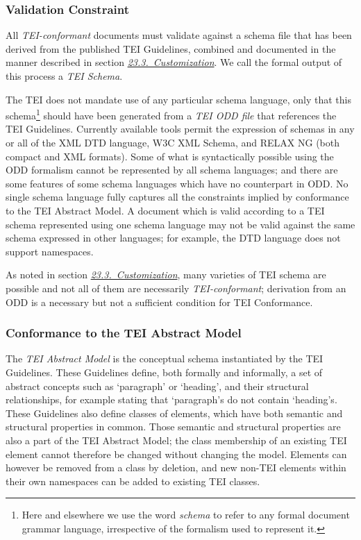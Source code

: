 \subsubsection[{Validation Constraint}]{Validation Constraint}\label{CFVL}\par
All \textit{TEI-conformant} documents must validate against a schema file that has been derived from the published TEI Guidelines, combined and documented in the manner described in section \textit{\hyperref[MD]{23.3.\ Customization}}. We call the formal output of this process a \textit{TEI Schema}.\par
The TEI does not mandate use of any particular schema language, only that this schema\footnote{Here and elsewhere we use the word \textit{schema} to refer to any formal document grammar language, irrespective of the formalism used to represent it.} should have been generated from a \textit{TEI ODD file} that references the TEI Guidelines. Currently available tools permit the expression of schemas in any or all of the XML DTD language, W3C XML Schema, and RELAX NG (both compact and XML formats). Some of what is syntactically possible using the ODD formalism cannot be represented by all schema languages; and there are some features of some schema languages which have no counterpart in ODD. No single schema language fully captures all the constraints implied by conformance to the TEI Abstract Model. A document which is valid according to a TEI schema represented using one schema language may not be valid against the same schema expressed in other languages; for example, the DTD language does not  support namespaces. \par
As noted in section \textit{\hyperref[MD]{23.3.\ Customization}}, many varieties of TEI schema are possible and not all of them are necessarily \textit{TEI-conformant}; derivation from an ODD is a necessary but not a sufficient condition for TEI Conformance.
\subsubsection[{Conformance to the TEI Abstract Model}]{Conformance to the TEI Abstract Model}\label{CFAM}\par
The \textit{TEI Abstract Model} is the conceptual schema instantiated by the TEI Guidelines. These Guidelines define, both formally and informally, a set of abstract concepts such as ‘paragraph’ or ‘heading’, and their structural relationships, for example stating that ‘paragraph’s do not contain ‘heading’s. These Guidelines also define classes of elements, which have both semantic and structural properties in common. Those semantic and structural properties are also a part of the TEI Abstract Model; the class membership of an existing TEI element cannot therefore be changed without changing the model. Elements can however be removed from a class by deletion, and new non-TEI elements within their own namespaces can be added to existing TEI classes.
